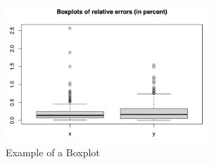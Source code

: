 \documentclass[12pt]{amsart}
\theoremstyle{definition}
\numberwithin{equation}{theorem}    %
\begin{document}
\begin{figure}[H]
    \centering
    \includegraphics[width=3in]{Media/Boxplot.png}
    \caption{Example of a Boxplot}
    \label{Boxplot}
\end{figure}
\end{document}
